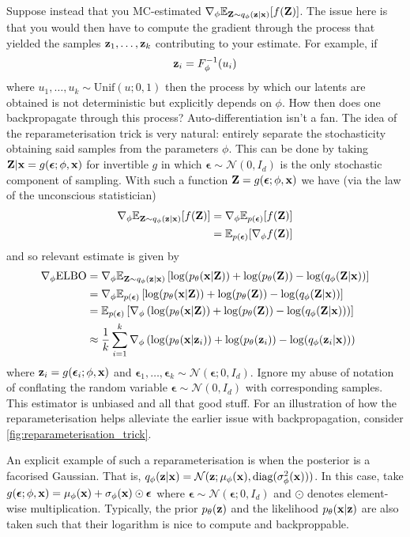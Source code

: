 \documentclass[11pt]{article}
\begin{document}
Suppose instead that you MC-estimated $\nabla_{\phi}\mathbb{E}_{\mathbf{Z}\sim q_{\phi}(\mathbf{z}|\mathbf{x})}[f(\mathbf{Z})]$. The issue here is that you would then have to compute the gradient through the process that yielded the samples $\mathbf{z}_1,\dots,\mathbf{z}_k$ contributing to your estimate. For example, if
$$
\mathbf{z}_i
=
F_{\phi}^{-1}(u_i)
$$
where $u_1,\dots,u_k\sim\text{Unif}(u;0,1)$ then the process by which our latents are obtained is not deterministic but explicitly depends on $\phi$. How then does one backpropagate through this process? Auto-differentiation isn't a fan. The idea of the reparameterisation trick is very natural: entirely separate the stochasticity obtaining said samples from the parameters $\phi$. This can be done by taking $\mathbf{Z}|\mathbf{x}=g(\bm{\epsilon}; \phi, \mathbf{x})$ for invertible $g$ in which $\bm{\epsilon}\sim\mathcal{N}(0, I_d)$ is the only stochastic component of sampling. With such a function $\mathbf{Z}=g(\bm{\epsilon};\phi,\mathbf{x})$ we have (via the law of the unconscious statistician)
\begin{align*}
    \nabla_{\phi}\mathbb{E}_{\mathbf{Z}\sim q_{\phi}(\mathbf{z}|\mathbf{x})}[f(\mathbf{Z})]
    &=
    \nabla_{\phi}\mathbb{E}_{p(\bm{\epsilon})}[f(\mathbf{Z})]\\
    &=
    \mathbb{E}_{p(\bm{\epsilon})}[\nabla_{\phi}f(\mathbf{Z})]
\end{align*}
and so relevant estimate is given by
\begin{align*}
    \nabla_{\phi}\text{ELBO}
    &=
    \nabla_{\phi}\mathbb{E}_{\mathbf{Z}\sim q_{\phi}(\mathbf{z}|\mathbf{x})}\left[\log(p_{\theta}(\mathbf{x}|\mathbf{Z}))+\log(p_{\theta}(\mathbf{Z}))-\log(q_{\phi}(\mathbf{Z}|\mathbf{x}))\right]\\
    &=
    \nabla_{\phi}\mathbb{E}_{p(\bm{\epsilon})}\left[\log(p_{\theta}(\mathbf{x}|\mathbf{Z}))+\log(p_{\theta}(\mathbf{Z}))-\log(q_{\phi}(\mathbf{Z}|\mathbf{x}))\right]\\
    &=
    \mathbb{E}_{p(\bm{\epsilon})}\left[\nabla_{\phi}\left(\log(p_{\theta}(\mathbf{x}|\mathbf{Z}))+\log(p_{\theta}(\mathbf{Z}))-\log(q_{\phi}(\mathbf{Z}|\mathbf{x}))\right)\right]\\
    &\approx
    \frac{1}{k}\sum_{i=1}^k\nabla_{\phi}\left(\log(p_{\theta}(\mathbf{x}|\mathbf{z}_i))+\log(p_{\theta}(\mathbf{z}_i))-\log(q_{\phi}(\mathbf{z}_i|\mathbf{x}))\right)
\end{align*}
where $\mathbf{z}_i=g(\bm{\epsilon}_i;\phi,\mathbf{x})$ and $\bm{\epsilon}_1,\dots,\bm{\epsilon}_k\sim\mathcal{N}(\bm{\epsilon};0,I_d)$. Ignore my abuse of notation of conflating the random variable $\bm{\epsilon}\sim\mathcal{N}(0,I_d)$ with corresponding samples. This estimator is unbiased and all that good stuff. For an illustration of how the reparameterisation helps alleviate the earlier issue with backpropagation, consider \autoref{fig:reparameterisation_trick}.

An explicit example of such a reparameterisation is when the posterior is a facorised Gaussian. That is, $q_{\phi}(\mathbf{z}|\mathbf{x})=\mathcal{N}(\mathbf{z};\mu_{\phi}(\mathbf{x}), \text{diag}(\sigma_{\phi}^2(\mathbf{x})))$. In this case, take $g(\bm{\epsilon};\phi,\mathbf{x})=\mu_{\phi}(\mathbf{x})+\sigma_{\phi}(\mathbf{x})\odot\bm{\epsilon}$ where $\bm{\epsilon}\sim\mathcal{N}(\bm{\epsilon};0,I_d)$ and $\odot$ denotes element-wise multiplication. Typically, the prior $p_{\theta}(\mathbf{z})$ and the likelihood $p_{\theta}(\mathbf{x}|\mathbf{z})$ are also taken such that their logarithm is nice to compute and backproppable.
\end{document}
